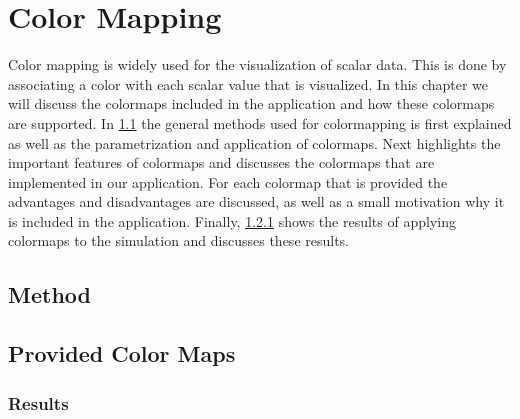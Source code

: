 
\chapter{Color Mapping} %
\label{cha:color_mapping}
Color mapping is widely used for the visualization of scalar data. This is done by associating a color with each scalar value that is visualized. In this chapter we will discuss the colormaps included in the application and how these colormaps are supported. In \cref{s:colormapping:method} the general methods used for colormapping is first explained as well as the parametrization and application of colormaps. Next  highlights the important features of colormaps and discusses the colormaps that are implemented in our application. For each colormap that is provided the advantages and disadvantages are discussed, as well as a small motivation why it is included in the application. Finally, \cref{s:colormapping:results} shows the results of applying colormaps to the simulation and discusses these results.


\section{Method}
\label{s:colormapping:method}


\section{Provided Color Maps}
\label{s:colormaps:differentmaps}


\subsection{Results}
\label{s:colormapping:results}


